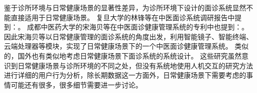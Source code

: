 

鉴于诊所环境与日常健康场景的显著性差异，为诊所环境下设计的面诊系统显然不能直接适用于日常健康场景。
复旦大学的林锋\cite{林锋2019中医面诊系统调研报告}等在中医面诊系统调研报告中提到：。
成都中医药大学的宋海贝\cite{宋海贝2019中医面诊健康管理系统}等在中医面诊健康管理系统的专利中也提到：。
因此宋海贝等以日常健康管理的面诊系统的角度出发，利用智能镜子、智能终端、云端处理器等模块，实现了日常健康场景下的一个中医面诊健康管理系统。
类似的，国外也有类似地考虑日常健康场景下面诊系统的系统设计\cite{andreu2015mirror}。
这些研究虽然意识到日常健康场景与诊所环境的不同之处，但没有系统地使用人机交互的研究方法进行详细的用户行为分析，除长期数据这一方面外，日常健康场景下需要考虑的事情可能还有很多，很多细节需要进一步讨论。

